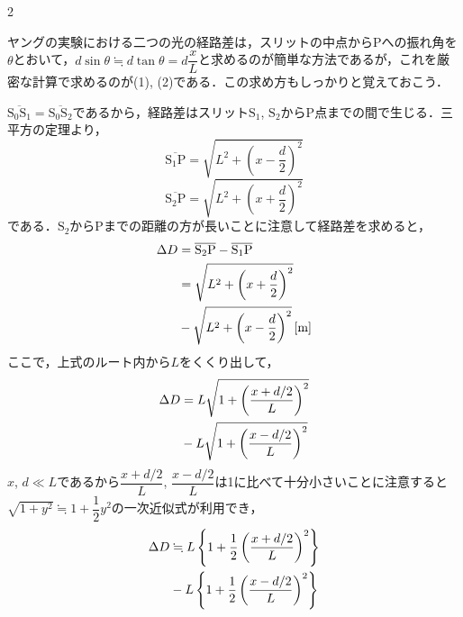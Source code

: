 \begin{multicols}{2}
\par\nopagebreak
\begin{sisin}
ヤングの実験における二つの光の経路差は，スリットの中点から$\mathrm{P}$への振れ角を$\theta$とおいて，$d\sin\theta\fallingdotseq d\tan\theta=d\dfrac{x}{L}$と求めるのが簡単な方法であるが，これを厳密な計算で求めるのが(1), (2)である．この求め方もしっかりと覚えておこう．
\end{sisin}
\KaiHead
\begin{komon}
 $\overline{\mathrm{S_0S_1}}=\overline{\mathrm{S_0S_2}}$であるから，経路差はスリット$\mathrm{S_1}$, $\mathrm{S_2}$から$\mathrm{P}$点までの間で生じる．三平方の定理より，
       \[\overline{\mathrm{S_1P}}=\sqrt{L^2+\left(x-\frac{d}{2}\right)^2}\]
       \[\overline{\mathrm{S_2P}}=\sqrt{L^2+\left(x+\frac{d}{2}\right)^2}\]
       である．$\mathrm{S_2}$から$\mathrm{P}$までの距離の方が長いことに注意して経路差を求めると，
       \[\begin{aligned}
         \Delta D&=\overline{\mathrm{S_2P}}-\overline{\mathrm{S_1P}}\\
          &=\sqrt{L^2+\left(x+\frac{d}{2}\right)^2}\\
          &\hspace*{\fill}-\sqrt{L^2+\left(x-\frac{d}{2}\right)^2}\U{m}
       \end{aligned}\]
       \hspace*{\fill}\Ans
{} ここで，上式のルート内から$L$をくくり出して，
       \[\begin{aligned}
         \Delta D&=L\sqrt{1+\left(\frac{x+d/2}{L}\right)^2}\\
          &\hspace*{\fill}-L\sqrt{1+\left(\frac{x-d/2}{L}\right)^2}
       \end{aligned}\]
       \hspace{1zw}$x$, $d\ll L$であるから$\dfrac{x+d/2}{L}$, $\dfrac{x-d/2}{L}$は1に比べて十分小さいことに注意すると$\sqrt{1+y^2}\fallingdotseq 1+\dfrac{1}{2}y^2$の一次近似式が利用でき，
       \[\begin{aligned}
         \Delta D&\fallingdotseq L\left\{1+\frac{1}{2}\left(\frac{x+d/2}{L}\right)^2\right\}\\
          &\hspace*{\fill}-L\left\{1+\frac{1}{2}\left(\frac{x-d/2}{L}\right)^2\right\}
       \end{aligned}\]

\end{komon}
\end{multicols}
